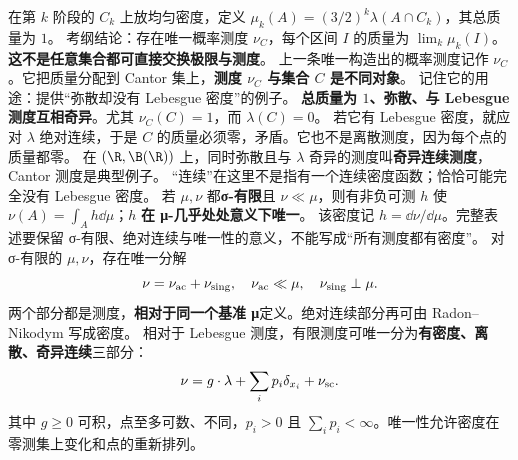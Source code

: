 在第 $k$ 阶段的 $C_k$ 上放均匀密度，定义 $\mu_k(A)=(3/2)^k\lambda(A\cap C_k)$，其总质量为 $1$。
考纲结论：存在唯一概率测度 $\nu_C$，每个区间 $I$ 的质量为 $\lim_k\mu_k(I)$。\textbf{这不是任意集合都可直接交换极限与测度}。
上一条唯一构造出的概率测度记作 $\nu_C$。它把质量分配到 Cantor 集上，\textbf{测度 $\nu_C$ 与集合 $C$ 是不同对象}。
记住它的用途：提供“弥散却没有 Lebesgue 密度”的例子。
\textbf{总质量为 $1$、弥散、与 Lebesgue 测度互相奇异}。尤其 $\nu_C(C)=1$，而 $\lambda(C)=0$。
若它有 Lebesgue 密度，就应对 $\lambda$ 绝对连续，于是 $C$ 的质量必须零，矛盾。它也不是离散测度，因为每个点的质量都零。
在 $(\R,\B(\R))$ 上，同时弥散且与 $\lambda$ 奇异的测度叫\textbf{奇异连续测度}，Cantor 测度是典型例子。
“连续”在这里不是指有一个连续密度函数；恰恰可能完全没有 Lebesgue 密度。
若 $\mu,\nu$ 都\textbf{σ-有限}且 $\nu\ll\mu$，则有非负可测 $h$ 使 $\nu(A)=\int_A h\dd\mu$；$h$ \textbf{在 μ-几乎处处意义下唯一}。
该密度记 $h=\dd\nu/\dd\mu$。完整表述要保留 σ-有限、绝对连续与唯一性的意义，不能写成“所有测度都有密度”。
对 σ-有限的 $\mu,\nu$，存在唯一分解
\[
\nu=\nu_{\rm ac}+\nu_{\rm sing},\quad
\nu_{\rm ac}\ll\mu,\quad\nu_{\rm sing}\perp\mu.
\]
两个部分都是测度，\textbf{相对于同一个基准 μ}定义。绝对连续部分再可由 Radon–Nikodym 写成密度。
相对于 Lebesgue 测度，有限测度可唯一分为\textbf{有密度、离散、奇异连续}三部分：
\[
\nu=g\cdot\lambda+\sum_i p_i\delta_{x_i}+\nu_{\rm sc}.
\]
其中 $g\ge0$ 可积，点至多可数、不同，$p_i>0$ 且 $\sum_i p_i<\infty$。唯一性允许密度在零测集上变化和点的重新排列。
